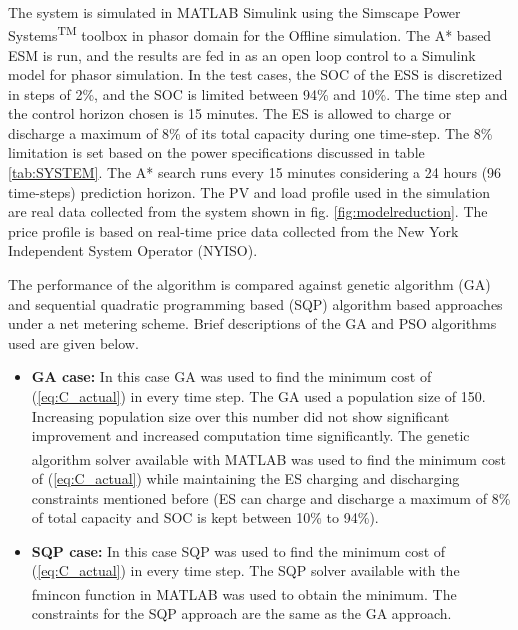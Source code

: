 The system is simulated in MATLAB\textsuperscript{\textregistered} Simulink\textsuperscript{\textregistered} using the Simscape Power Systems\textsuperscript{TM} toolbox in phasor domain for the Offline simulation. The A* based ESM is run, and the results are fed in as an open loop control to a Simulink model for phasor simulation. In the test cases, the  SOC of the ESS is discretized in steps of 2\%, and the SOC is limited between  94\%  and  10\%. The time step and the control horizon chosen is 15 minutes. The ES is allowed to charge or discharge a maximum of 8\% of its total capacity during one time-step. The 8\% limitation is set based on the power specifications discussed in table \ref{tab:SYSTEM}. The A* search runs every 15 minutes considering a 24 hours (96 time-steps) prediction horizon. The PV and load profile used in the simulation are real data collected from the system shown in fig. \ref{fig:modelreduction}. The price profile is based on real-time price data collected from the New York Independent System Operator (NYISO).




The performance of the algorithm is compared against genetic algorithm (GA) and sequential quadratic programming based (SQP) algorithm based approaches under a net metering scheme. Brief descriptions of the GA and PSO algorithms used are given below.
\begin{itemize}
    \item \textbf{GA case:} In this case GA was used to find the minimum cost of (\ref{eq:C_actual}) in every time step. The GA used a population size of 150. Increasing population size over this number did not show significant improvement and increased computation time significantly. The genetic algorithm solver available with MATLAB\textsuperscript{\textregistered} \cite{GA} was used to find the minimum cost of  (\ref{eq:C_actual}) while maintaining the ES charging and discharging constraints mentioned before (ES can charge and discharge a maximum of 8\% of total capacity and SOC is kept between 10\% to 94\%).
    
    \item \textbf{SQP case:} In this case SQP was used to find the minimum cost of (\ref{eq:C_actual}) in every time step. The SQP solver available with the fmincon function in  MATLAB\textsuperscript{\textregistered} was used to obtain the minimum. The constraints for the SQP approach are the same as the GA approach.

\end{itemize}

